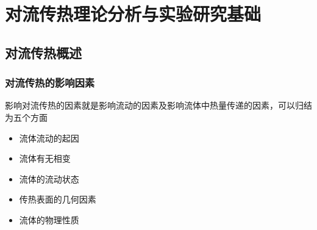 \chapter{对流传热理论分析与实验研究基础}
\thispagestyle{empty}
\section{对流传热概述}

\subsection{对流传热的影响因素}
\noindent 影响对流传热的因素就是影响流动的因素及影响流体中热量传递的因素，可以归结为五个方面
\begin{itemize}
	\item 流体流动的起因
\vspace*{-0.5em}
	\item 流体有无相变
\vspace*{-0.5em}
	\item 流体的流动状态
\vspace*{-0.5em}
	\item 传热表面的几何因素
\vspace*{-0.5em}
	\item 流体的物理性质
\end{itemize}
\vspace*{0.5em}

